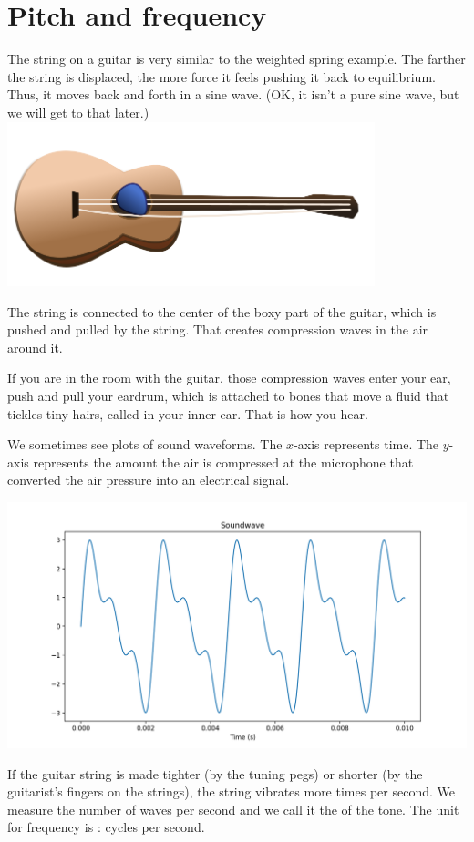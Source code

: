 \section{Pitch and frequency}

The string on a guitar is very similar to the weighted spring
example. The farther the string is displaced, the more force it feels
pushing it back to equilibrium. Thus, it moves back and forth in a
sine wave. (OK, it isn't a pure sine wave, but we will get to that later.)
\includegraphics[width=0.8\textwidth]{guitar.png}

The string is connected to the center of the boxy part of the guitar,
which is pushed and pulled by the string. That creates compression
waves in the air around it.

If you are in the room with the guitar, those compression waves enter
your ear, push and pull your eardrum, which is attached to bones that
move a fluid that tickles tiny hairs, called  in your
inner ear. That is how you hear.

We sometimes see plots of sound waveforms.  The $x$-axis represents
time. The $y$-axis represents the amount the air is compressed at the
microphone that converted the air pressure into an electrical signal.

\includegraphics[width=0.8\linewidth]{soundwave.png}

If the guitar string is made tighter (by the tuning pegs) or shorter
(by the guitarist's fingers on the strings), the string vibrates more
times per second.  We measure the number of waves per second and we
call it the  of the tone. The unit for frequency is
: cycles per second.

